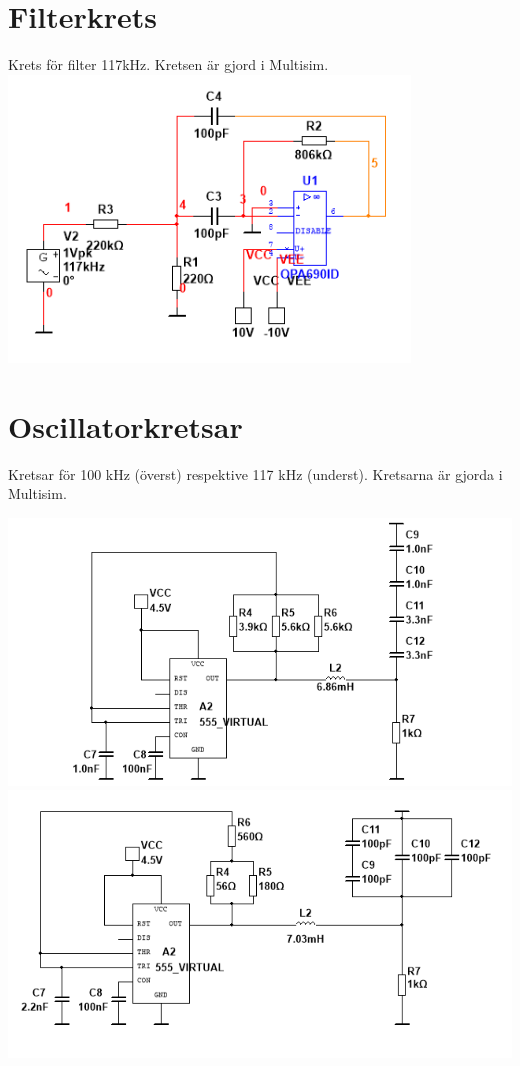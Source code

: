 \documentclass[a4paper]{article}
\begin{document}
\begin{sloppypar}
    \newpage
    \section{Filterkrets}
    \label{bilaga:Kretsschema-filter}
    Krets för filter 117kHz. Kretsen är gjord i Multisim.
    \includegraphics[width = 0.8\textwidth]{filter117kHz-circuit.png}

    \newpage
    \section{Oscillatorkretsar}
    Kretsar för 100 kHz (överst) respektive 117 kHz (underst). Kretsarna är gjorda i Multisim.

    \label{bilaga:Schema-Oscillatorkretsar}
    \includegraphics[width = \textwidth]{555-100kHz-circuit.png}
    \includegraphics[width = \textwidth]{555-117kHz-circuit.png}


\end{sloppypar}
\end{document}
